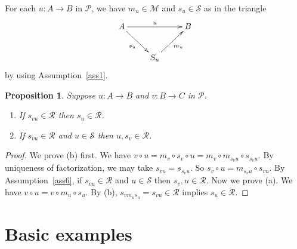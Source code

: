 \documentclass[a4paper,12pt,reqno]{amsart}
\newtheorem{proposition}[theorem]{Proposition}
\theoremstyle{definition}
\theoremstyle{fact}
\theoremstyle{genquest}
\theoremstyle{step}
\newcommand{\dd}{\colon}
\newcommand{\ra}{\rightarrow}
\def\CM{{\mathscr M}}
\def\CP{{\mathscr P}}
\def\CR{{\mathscr R}}
\def\CS{{\mathscr S}}
\begin{document}
For each $u\dd A\ra B$ in $\CP$, we have $m_u\in \CM$ and $s_u\in \CS$ as in the triangle
\begin{eqnarray}\label{fact_u}
\begin{aligned}
\xymatrix{
A \ar[rd]_{s_u}\ar[rr]^{u}   && B  \\
& S_u \ar[ru]_{m_u}  &
} 
\end{aligned}
\end{eqnarray}  
by using Assumption~\ref{ass1}.

\begin{proposition}\label{esssub}
Suppose $u\dd A\ra B$ and $v\dd B\ra C$ in $\CP$. 
\begin{enumerate}
\item[(a)] If $s_{vu}\in \CR$ then $s_u\in \CR$. 
\item[(b)] If $s_{vu}\in \CR$ and $u\in \CS$ then $u, s_v\in \CR$.
\end{enumerate}
\end{proposition}
\begin{proof}
We prove (b) first. We have $v\circ u = m_v\circ s_v \circ u = m_v \circ m_{s_vu} \circ s_{s_vu}$. By uniqueness of factorization, we may take $s_{vu}= s_{s_vu}$.
So $s_v\circ u = m_{s_vu} \circ s_{vu}$. By Assumption~\ref{ass6}, if $s_{vu}\in \CR$ and $u\in \CS$ then $s_v, u\in \CR$. 
Now we prove (a). We have $v\circ u = v \circ m_u\circ s_u$.
By (b), $s_{vm_us_u} = s_{vu} \in \CR$ implies $s_u\in \CR$.  \end{proof}

\section{Basic examples}\label{basex}
\end{document}
